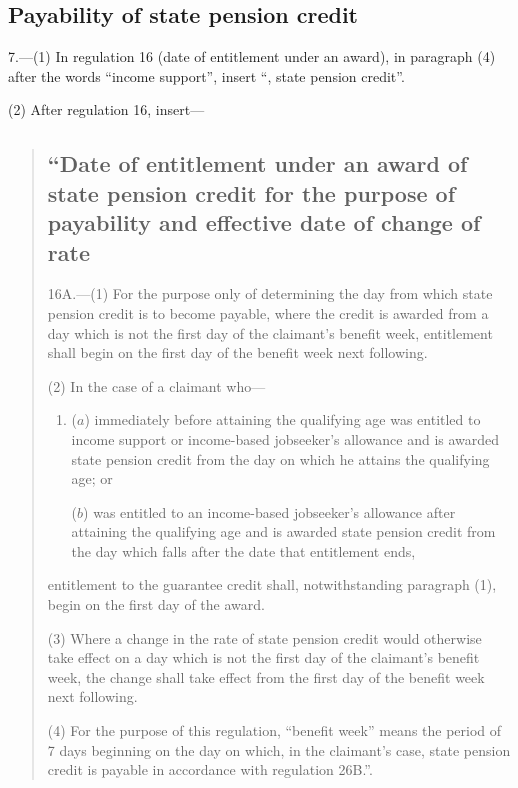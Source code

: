 \documentclass[12pt,a4paper]{article}
\begin{document}
\subsection[7. Payability of state pension credit]{Payability of state pension credit}

7.---(1)  In regulation 16 (date of entitlement under an award), in paragraph (4) after the words “income support”, insert “, state pension credit”.

(2) After regulation 16, insert—
\begin{quotation}
\subsection*{“Date of entitlement under an award of state pension credit for the purpose of payability and effective date of change of rate}

16A.---(1)  For the purpose only of determining the day from which state pension credit is to become payable, where the credit is awarded from a day which is not the first day of the claimant’s benefit week, entitlement shall begin on the first day of the benefit week next following.

(2) In the case of a claimant who—
\begin{enumerate}\item[]
($a$) immediately before attaining the qualifying age was entitled to income support or income-based jobseeker’s allowance and is awarded state pension credit from the day on which he attains the qualifying age; or

($b$) was entitled to an income-based jobseeker’s allowance after attaining the qualifying age and is awarded state pension credit from the day which falls after the date that entitlement ends,
\end{enumerate}
entitlement to the guarantee credit shall, notwithstanding paragraph (1), begin on the first day of the award.

(3) Where a change in the rate of state pension credit would otherwise take effect on a day which is not the first day of the claimant’s benefit week, the change shall take effect from the first day of the benefit week next following.

(4) For the purpose of this regulation, “benefit week” means the period of 7 days beginning on the day on which, in the claimant’s case, state pension credit is payable in accordance with regulation 26B.”.
\end{quotation}
\end{document}
